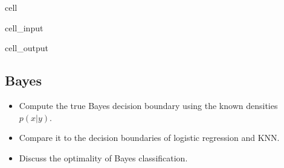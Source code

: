 \documentclass[letterpaper,10pt,english]{jupyterBook}
\begin{document}
\begin{sphinxuseclass}{cell}\begin{sphinxVerbatimInput}

\begin{sphinxuseclass}{cell_input}
\begin{sphinxVerbatim}[commandchars=\\\{\}]
 

     
       
       
\end{sphinxVerbatim}

\end{sphinxuseclass}\end{sphinxVerbatimInput}
\begin{sphinxVerbatimOutput}

\begin{sphinxuseclass}{cell_output}
\noindent{}

\noindent{}

\noindent{}

\end{sphinxuseclass}\end{sphinxVerbatimOutput}

\end{sphinxuseclass}

\subsection{Bayes}
\label{\detokenize{06:bayes}}\begin{itemize}
\item {} 
\sphinxAtStartPar
Compute the true Bayes decision boundary using the known densities \(p(x|y)\).

\item {} 
\sphinxAtStartPar
Compare it to the decision boundaries of logistic regression and KNN.

\item {} 
\sphinxAtStartPar
Discuss the optimality of Bayes classification.

\end{itemize}
\end{document}
